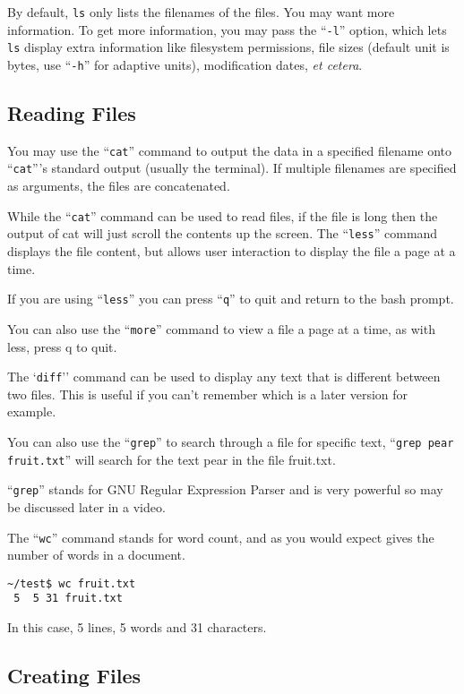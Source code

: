 \documentclass{extbook}
\begin{document}
By default, \verb|ls| only lists the filenames of the files. You may want more information. To get more information, you may pass the ``\verb|-l|'' option, which lets \verb|ls| display extra information like filesystem permissions, file sizes (default unit is bytes, use ``\verb|-h|'' for adaptive units), modification dates, \textit{et cetera}.

\subsection{Reading Files}

You may use the ``\verb|cat|'' command to output the data in a specified filename onto ``\verb|cat|'''s standard output (usually the terminal). If multiple filenames are specified as arguments, the files are concatenated.

While the ``\verb|cat|'' command can be used to read files, if the file is long then the output of cat will just scroll the contents up the screen. The ``\verb|less|'' command displays the file content, but allows user interaction to display the file a page at a time.

If you are using ``\verb|less|'' you can press ``\verb|q|'' to quit and return to the bash prompt.

You can also use the ``\verb|more|'' command to view a file a page at a time, as with less, press q to quit.

The `\verb|diff|'' command can be used to display any text that is different between two files. This is useful if you can't remember which is a later version for example.

You can also use the ``\verb|grep|'' to search through a file for specific text,
``\verb|grep pear fruit.txt|'' will search for the text pear in the file fruit.txt.

``\verb|grep|'' stands for GNU Regular Expression Parser and is very powerful so may be discussed later in a video.

The ``\verb|wc|'' command stands for word count, and as you would expect gives the number of words in a document.

\begin{verbatim}
~/test$ wc fruit.txt
 5  5 31 fruit.txt
\end{verbatim}

In this case,  5 lines, 5 words and 31 characters.



\subsection{Creating Files}
\end{document}
